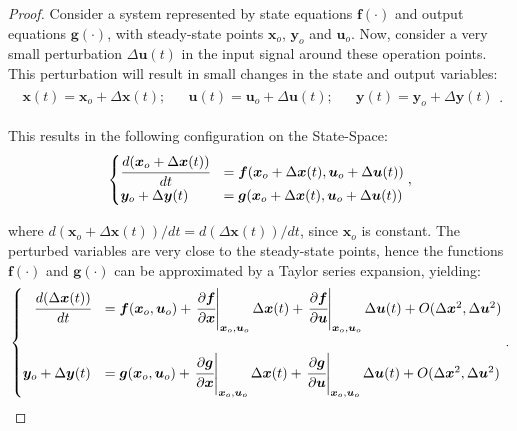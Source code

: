 \documentclass[a4paper,11pt]{book}
\numberwithin{figure}{chapter}
\numberwithin{equation}{chapter}
\numberwithin{table}{chapter}
\theoremstyle{definition}
\begin{document}
\begin{proof}
    Consider a system represented by state equations $\bm{f}(\cdot)$ and output equations $\bm{g}(\cdot)$, with steady-state points $\bm{x}_o$, $\bm{y}_o$ and $\bm{u}_o$. Now, consider a very small perturbation $\Delta \bm{u}(t)$ in the input signal around these operation points. This perturbation will result in small changes in the state and output variables:
    \begin{align}
    \begin{matrix}
        \bm{x}(t) = \bm{x}_o + \Delta \bm{x}(t); & &
        \bm{u}(t) = \bm{u}_o + \Delta \bm{u}(t); & &
        \bm{y}(t) = \bm{y}_o + \Delta \bm{y}(t)
    \end{matrix}
    .\end{align}
    
    \noindent This results in the following configuration on the State-Space:
    \begin{align}
    \begin{cases}
        \cfrac{d(\bm{x}_o + \Delta \bm{x}(t))}{dt} &= \bm{f}(\bm{x}_o + \Delta \bm{x}(t), \bm{u}_o + \Delta \bm{u}(t) ) \\
        \bm{y}_o + \Delta \bm{y}(t) &= \bm{g}(\bm{x}_o + \Delta \bm{x}(t), \bm{u}_o + \Delta \bm{u}(t) ) \\
    \end{cases}
    ,\end{align}
    
    \noindent where $d(\bm{x}_o + \Delta \bm{x}(t)) / dt = d(\Delta \bm{x}(t)) / dt$, since $\bm{x}_o$ is constant. The perturbed variables are very close to the steady-state points, hence the functions $\bm{f}(\cdot)$ and $\bm{g}(\cdot)$ can be approximated by a Taylor series expansion, yielding:
    \begin{align}
    \begin{cases}
        \hfill \cfrac{d(\Delta \bm{x}(t))}{dt} &= \bm{f}(\bm{x}_o, \bm{u}_o) + \left. \cfrac{\partial \bm{f}}{\partial \bm{x}}\right\vert_{\bm{x}_o, \bm{u}_o} \Delta \bm{x}(t) + \left. \cfrac{\partial \bm{f}}{\partial \bm{u}}\right\vert_{\bm{x}_o, \bm{u}_o}  \Delta \bm{u}(t) + O(\Delta \bm{x}^2, \Delta \bm{u}^2) \\ \\
        \bm{y}_o + \Delta \bm{y}(t) &= \bm{g}(\bm{x}_o, \bm{u}_o) + \left. \cfrac{\partial \bm{g}}{\partial \bm{x}}\right\vert_{\bm{x}_o, \bm{u}_o} \Delta \bm{x}(t) + \left. \cfrac{\partial \bm{g}}{\partial \bm{u}}\right\vert_{\bm{x}_o, \bm{u}_o}  \Delta \bm{u}(t) + O(\Delta \bm{x}^2, \Delta \bm{u}^2) \\
    \end{cases}
    .\end{align}
    

\end{proof}
\end{document}
